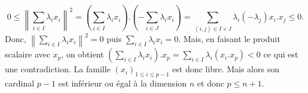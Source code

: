 {{$$0\leq\left\|\sum_{i\in I}^{}\lambda_ix_i\right\|^2=\left(\sum_{i\in I}^{}\lambda_ix_i\right).\left(-\sum_{i\in  J}^{}\lambda_ix_i\right)=\sum_{(i,j)\in I\times J}^{}\lambda_i(-\lambda_j)x_i.x_j\leq 0.$$
Donc, $\left\|\sum_{i\in I}^{}\lambda_ix_i\right\|^2=0$ puis $\sum_{i\in I}^{}\lambda_ix_i=0$.
Mais, en faisant le produit scalaire avec $x_p$, on obtient $\left(\sum_{i\in I}^{}\lambda_ix_i\right).x_p=\sum_{i\in I}^{}\lambda_i(x_i.x_p)<0$ ce qui est une contradiction.
La famille $(x_i)_{1\leq i\leq p-1}$ est donc libre. Mais alors son cardinal $p-1$ est inférieur ou égal à la dimension $n$ et donc $p\leq n+1$.
}
}
